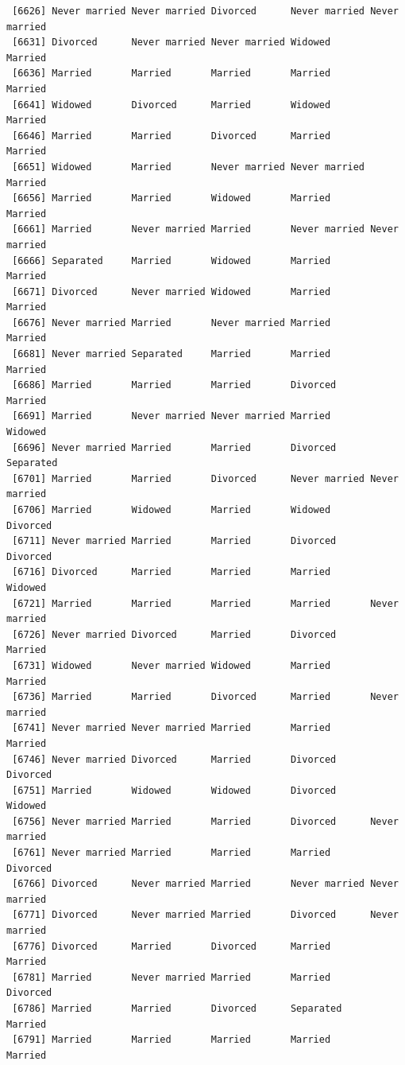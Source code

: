 \documentclass[
  letterpaper,
  DIV=11,
  numbers=noendperiod,
  oneside]{scrartcl}
\begin{document}
\begin{verbatim}
 [6626] Never married Never married Divorced      Never married Never married
 [6631] Divorced      Never married Never married Widowed       Married      
 [6636] Married       Married       Married       Married       Married      
 [6641] Widowed       Divorced      Married       Widowed       Married      
 [6646] Married       Married       Divorced      Married       Married      
 [6651] Widowed       Married       Never married Never married Married      
 [6656] Married       Married       Widowed       Married       Married      
 [6661] Married       Never married Married       Never married Never married
 [6666] Separated     Married       Widowed       Married       Married      
 [6671] Divorced      Never married Widowed       Married       Married      
 [6676] Never married Married       Never married Married       Married      
 [6681] Never married Separated     Married       Married       Married      
 [6686] Married       Married       Married       Divorced      Married      
 [6691] Married       Never married Never married Married       Widowed      
 [6696] Never married Married       Married       Divorced      Separated    
 [6701] Married       Married       Divorced      Never married Never married
 [6706] Married       Widowed       Married       Widowed       Divorced     
 [6711] Never married Married       Married       Divorced      Divorced     
 [6716] Divorced      Married       Married       Married       Widowed      
 [6721] Married       Married       Married       Married       Never married
 [6726] Never married Divorced      Married       Divorced      Married      
 [6731] Widowed       Never married Widowed       Married       Married      
 [6736] Married       Married       Divorced      Married       Never married
 [6741] Never married Never married Married       Married       Married      
 [6746] Never married Divorced      Married       Divorced      Divorced     
 [6751] Married       Widowed       Widowed       Divorced      Widowed      
 [6756] Never married Married       Married       Divorced      Never married
 [6761] Never married Married       Married       Married       Divorced     
 [6766] Divorced      Never married Married       Never married Never married
 [6771] Divorced      Never married Married       Divorced      Never married
 [6776] Divorced      Married       Divorced      Married       Married      
 [6781] Married       Never married Married       Married       Divorced     
 [6786] Married       Married       Divorced      Separated     Married      
 [6791] Married       Married       Married       Married       Married      

\end{verbatim}
\end{document}
